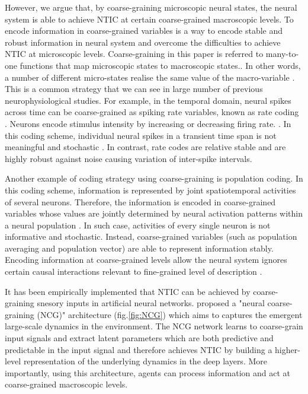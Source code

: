 \documentclass[utf8]{article}
\begin{document}
		However, we argue that, by coarse-graining microscopic neural states, the neural system is able to achieve NTIC at certain coarse-grained macroscopic levels. To encode information in coarse-grained variables is a way to encode stable and robust information in neural system and overcome the difficulties to achieve NTIC at microscopic levels. Coarse-graining in this paper is referred to many-to-one functions that map microscopic states to macroscopic states.. In other words, a number of different micro-states realise the same value of the macro-variable \citep{price2007causation}. This is a common strategy that we can see in large number of previous neurophysiological studies. For example, in the temporal domain, neural spikes across time can be coarse-grained as spiking rate variables, known as rate coding \citep{adrian1926impulses, gerstner2002spiking, maass2001pulsed, panzeri2015neural, stein2005neuronal}. Neurons encode stimulus intensity by increasing or decreasing firing rate. \citep{kandel2000principles}. In this coding scheme, individual neural spikes in a transient time span is not meaningful and stochastic \citep{stein2005neuronal}. In contrast, rate codes are relative stable and are highly robust against noise causing variation of inter-spike intervals. 
		
		Another example of coding strategy using coarse-graining is population coding. In this coding scheme, information is represented by joint spatiotemporal activities of several neurons. Therefore, the information is encoded in coarse-grained variables whose values are jointly determined by neural activation patterns within a neural population \citep{kristan1997population, pouget2000information, binder2009encyclopedia, QuianQuiroga2009}. In such case, activities of every single neuron is not informative and stochastic. Instead, coarse-grained variables (such as population averaging and population vector) are able to represent information stably. Encoding information at coarse-grained levels allow the neural system ignores certain causal interactions relevant to fine-grained level of description \citep{Woodward2007-WOOCWA}.
			
			
		It has been empirically implemented that NTIC can be achieved by coarse-graining snesory inputs in artificial neural networks. \citep{guttenberg2016neural} proposed a "neural coarse-graining (NCG)" architecture (fig.\ref{fig:NCG}) which aims to captures the emergent large-scale dynamics in the environment. The NCG network learns to coarse-grain input signals and extract latent parameters which are both predictive and predictable in the input signal and therefore achieves NTIC by building a higher-level representation of the underlying dynamics in the deep layers. More importantly, using this architecture, agents can process information and act at coarse-grained macroscopic levels.
		
\end{document}
